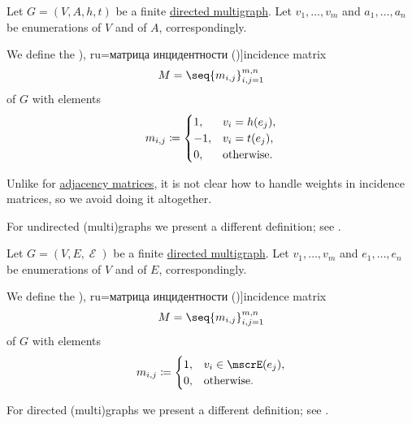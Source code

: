 \begin{definition}\label{def:directed_incidence_matrix}
  Let \( G = (V, A, h, t) \) be a finite \hyperref[def:directed_multigraph]{directed multigraph}. Let \( v_1, \ldots, v_m \) and \( a_1, \ldots, a_n \) be enumerations of \( V \) and of \( A \), correspondingly.

  We define the \term[bg=матрица на инцидентност (\cite[47]{Мирчев2001}), ru=матрица инцидентности (\cite[289]{БелоусовТкачёв2004})]{incidence matrix}
  \begin{equation*}
    M = \seq{ m_{i,j} }_{i,j=1}^{m,n}
  \end{equation*}
  of \( G \) with elements
  \begin{equation*}
    m_{i,j} \coloneqq \begin{cases}
      1,  &v_i = h(e_j), \\
      -1, &v_i = t(e_j), \\
      0,  &\T{otherwise.}
    \end{cases}
  \end{equation*}
\end{definition}
\begin{comments}
  \item Unlike for \hyperref[def:graph_adjacency_matrix]{adjacency matrices}, it is not clear how to handle weights in incidence matrices, so we avoid doing it altogether.
  \item For undirected (multi)graphs we present a different definition; see .
\end{comments}

\begin{definition}\label{def:undirected_incidence_matrix}
  Let \( G = (V, E, \mscrE) \) be a finite \hyperref[def:directed_multigraph]{directed multigraph}. Let \( v_1, \ldots, v_m \) and \( e_1, \ldots, e_n \) be enumerations of \( V \) and of \( E \), correspondingly.

  We define the \term[bg=матрица на инцидентност (\cite[47]{Мирчев2001}), ru=матрица инцидентности (\cite[288]{БелоусовТкачёв2004})]{incidence matrix}
  \begin{equation*}
    M = \seq{ m_{i,j} }_{i,j=1}^{m,n}
  \end{equation*}
  of \( G \) with elements
  \begin{equation*}
    m_{i,j} \coloneqq \begin{cases}
      1,  &v_i \in \mscrE(e_j), \\
      0,  &\T{otherwise.}
    \end{cases}
  \end{equation*}
\end{definition}
\begin{comments}
  \item For directed (multi)graphs we present a different definition; see .
\end{comments}

